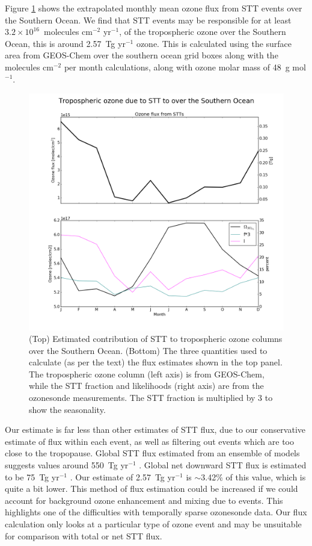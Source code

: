 \documentclass{article}
\begin{document}
  Figure \ref{fig:SOExtrapolation} shows the extrapolated monthly mean ozone flux from STT events over the Southern Ocean.
  We find that STT events may be responsible for at least $3.2 \times10^{16}$~molecules cm$^{-2}$ yr$^{-1}$, of the tropospheric ozone over the Southern Ocean, this is around 2.57~Tg yr$^{-1}$ ozone.
  This is calculated using the surface area from GEOS-Chem over the southern ocean grid boxes along with the molecules cm$^{-2}$ per month calculations, along with ozone molar mass of 48~g mol$^{-1}$.
    
  \begin{figure}[!htbp]
    \includegraphics[width=\textwidth]{figures/SO_extrapolation.png}
    \caption{(Top) Estimated contribution of STT to tropospheric ozone columns over the Southern Ocean.
      (Bottom) The three quantities used to calculate (as per the text) the flux estimates shown in the top panel.
      The tropospheric ozone column (left axis) is from GEOS-Chem, while the STT fraction and likelihoods (right axis) are from the ozonesonde measurements.
      The STT fraction is multiplied by 3 to show the seasonality.}
    \label{fig:SOExtrapolation}
  \end{figure}
  
  Our estimate is far less than other estimates of STT flux, due to our conservative estimate of flux within each event, as well as filtering out events which are too close to the tropopause.
  Global STT flux estimated from an ensemble of models suggests values around 550~Tg yr$^{-1}$ \citep{Stevenson2006}.
  Global net downward STT flux is estimated to be 75~Tg yr$^{-1}$ \citep{Sprenger2003}.
  Our estimate of 2.57~Tg yr$^{-1}$ is $\sim$3.42\% of this value, which is quite a bit lower.
  This method of flux estimation could be increased if we could account for background ozone enhancement and mixing due to events.
  This highlights one of the difficulties with temporally sparse ozonesonde data.
  Our flux calculation only looks at a particular type of ozone event and may be unsuitable for comparison with total or net STT flux.
  
\end{document}
